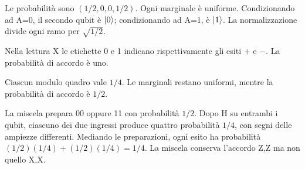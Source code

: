 

Le probabilità sono \((1/2,0,0,1/2)\). Ogni marginale è uniforme. Condizionando ad A=0, il secondo qubit è \(\lvert 0\rangle\); condizionando ad A=1, è \(\lvert 1\rangle\). La normalizzazione divide ogni ramo per \(\sqrt{1/2}\).


Nella lettura X le etichette 0 e 1 indicano rispettivamente gli esiti \(+\) e \(-\). La probabilità di accordo è uno.


Ciascun modulo quadro vale \(1/4\). Le marginali restano uniformi, mentre la probabilità di accordo è \(1/2\).


La miscela prepara 00 oppure 11 con probabilità \(1/2\). Dopo H su entrambi i qubit, ciascuno dei due ingressi produce quattro probabilità \(1/4\), con segni delle ampiezze differenti. Mediando le preparazioni, ogni esito ha probabilità \((1/2)(1/4)+(1/2)(1/4)=1/4\). La miscela conserva l’accordo Z,Z ma non quello X,X.

